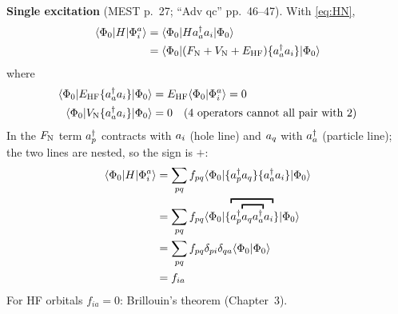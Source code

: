 \textbf{Single excitation} (MEST p.~27; “Adv qc” pp.~46--47). With \eqref{eq:HN},
\begin{align*}
\langle \Phi_0|H|\Phi_i^a\rangle &= \langle \Phi_0|H a^{\dagger}_{a} a_{i}|\Phi_0\rangle \\
&= \langle \Phi_0|(F_{\mathrm{N}} + V_{\mathrm{N}} + E_{\text{HF}}) \{a^{\dagger}_{a} a_{i}\}|\Phi_0\rangle
\end{align*}
where
\begin{align*}
\langle \Phi_0|E_{\text{HF}} \{a^{\dagger}_{a} a_{i}\}|\Phi_0\rangle &= E_{\text{HF}} \langle \Phi_0|\Phi_i^a\rangle = 0 \\
\langle \Phi_0|V_{\mathrm{N}} \{a^{\dagger}_{a} a_{i}\}|\Phi_0\rangle &= 0 \quad\text{(4 operators cannot all pair with 2)}
\end{align*}
In the $F_{\mathrm{N}}$ term $a^{\dagger}_{p}$ contracts with $a_{i}$ (hole line) and $a_{q}$ with $a^{\dagger}_{a}$ (particle line); the two lines are nested, so the sign is $+$:
\begin{align*}
\langle \Phi_0|H|\Phi_i^a\rangle &= \sum_{pq} f_{pq} \langle \Phi_0|\no{\cre{p} \ann{q}} \no{\cre{a} \ann{i}}|\Phi_0\rangle \\
&= \sum_{pq} f_{pq} \langle \Phi_0|\no{\contraction{\cre{p} {\contraction{\ann{q} \cre{a}}} \ann{i}}}|\Phi_0\rangle \\
&= \sum_{pq} f_{pq} \delta_{pi} \delta_{qa} \langle \Phi_0|\Phi_0\rangle \\
&= f_{ia}
\end{align*}
For HF orbitals $f_{ia} = 0$: Brillouin's theorem (Chapter~3).

